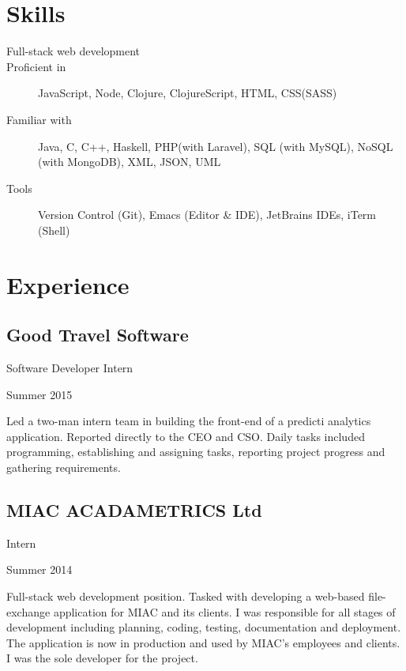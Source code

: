 \documentclass[a4paper]{article}
\begin{document}
\section*{Skills}
\begin{description}
\item[Full-stack web development]
\item[Proficient in] JavaScript, Node, Clojure, ClojureScript, HTML, CSS(SASS)
\item[Familiar with] Java, C, C++, Haskell, PHP(with Laravel), SQL (with MySQL), NoSQL (with MongoDB), XML, JSON, UML
\item[Tools] Version Control (Git), Emacs (Editor \& IDE), JetBrains IDEs, iTerm (Shell)
\end{description}

\section*{Experience}

\subsection*{Good Travel Software}
\begin{minipage}[b]{0.5\textwidth}
  \flushleft
  Software Developer Intern
\end{minipage}
\begin{minipage}[b]{0.5\textwidth}
  \flushright
  Summer 2015
\end{minipage}
Led a two-man intern team in building the front-end of a predicti analytics application. Reported directly to the CEO and CSO. Daily tasks included programming, establishing and assigning tasks, reporting project progress and gathering requirements.

\subsection*{MIAC ACADAMETRICS Ltd}
\begin{minipage}[b]{0.5\textwidth}
  \flushleft
  Intern
\end{minipage}
\begin{minipage}[b]{0.5\textwidth}
  \flushright
  Summer 2014
\end{minipage}
Full-stack web development position. Tasked with developing a web-based  file-exchange application for MIAC and its clients. I was responsible for all stages of development including planning, coding, testing, documentation and deployment. The application is now in production and used by MIAC’s employees and clients. I was the sole developer for the project.
\end{document}
